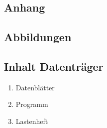 \documentclass[12pt,a4paper,oneside,numbers=noenddot,headsepline,captions=tableheading,toc=bibliography,openany,tikz,margin=5mm]{scrbook}
\begin{document}
	\printbibliography[title={Quellenverzeichnis}]
	\clearpage
	
	\begin{appendix}
			\chapter{Anhang} 
			\section{Abbildungen} 
			\label{Abbildungen}
					\newpage 
					
				
					
					\section{Inhalt Datenträger} 
					\label{dataCD}
					\begin{enumerate}[label=\textbf{\arabic*},ref=A.1.\arabic*]
						\item Datenblätter
						\label{it: Datenblätter}
						\item Programm
						\label{it: Programm}
						\item Lastenheft
						\label{it: Lastenheft}
					\end{enumerate}
				
		
	\end{appendix}
	
	
\end{document}
